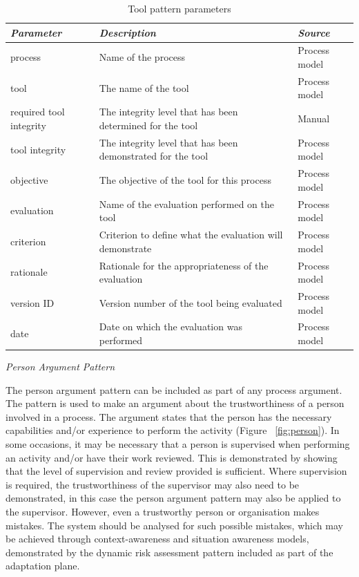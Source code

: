 \documentclass[12pt,twoside,a4paper]{article}
\begin{document}
\begin{table}[htbp]
    \centering
    \caption{Tool pattern parameters}
    \begin{tabularx}{\textwidth}{| X | X | X |}
        \hline
        \textit{\textbf{Parameter}}     & \textit{\textbf{Description}}    & \textit{\textbf{Source}}     \\ \hline
       process       & Name of the process & Process model      \\ \hline
       tool        & The name of the tool & Process model      \\ \hline
       required tool integrity        & The integrity level that has been determined for the tool & Manual      \\ \hline
       tool integrity       & The integrity level that has been demonstrated for the tool & Process model      \\ \hline
       objective       & The objective of the tool for this process & Process model      \\ \hline
       evaluation       & Name of the evaluation performed on the tool & Process model      \\ \hline
       criterion       & Criterion to define what the evaluation will demonstrate & Process model      \\ \hline
       rationale       & Rationale for the appropriateness of the evaluation & Process model      \\ \hline
       version ID      & Version number of the tool being evaluated & Process model      \\ \hline
       date     & Date on which the evaluation was performed & Process model      \\ \hline
       
    \end{tabularx}
    \label{tab:tool_params}
\end{table}


\clearpage
\emph{Person Argument Pattern}

The person argument pattern can be included as part of any process argument. The pattern is used to make an argument about the trustworthiness of a person involved in a process. The argument states that the person has the necessary capabilities and/or experience to perform the activity (Figure ~\ref{fig:person}). In some occasions, it may be necessary that a person is supervised when performing an activity and/or have their work reviewed. This is demonstrated by showing that the level of supervision and review provided is sufficient. Where supervision is required, the trustworthiness of the supervisor may also need to be demonstrated, in this case the person argument pattern may also be applied to the supervisor.
However, even a trustworthy person or organisation makes mistakes. The system should be analysed for such possible mistakes, which may be achieved through context-awareness and situation awareness models, demonstrated by the dynamic risk assessment pattern included as part of the adaptation plane.
\end{document}
